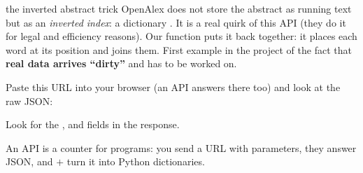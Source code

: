 \documentclass[11pt,a4paper]{article}
\begin{document}
\begin{concepto}{the inverted abstract trick}
OpenAlex does not store the abstract as running text but as an \emph{inverted index}: a
dictionary . It is a real quirk of this API
(they do it for legal and efficiency reasons). Our 
function puts it back together: it places each word at its position and joins them. First
example in the project of the fact that \textbf{real data arrives ``dirty''} and has to be
worked on.
\end{concepto}

\begin{practica}
Paste this URL into your browser (an API answers there too) and look at the raw JSON:
\begin{center}
\small{}
\end{center}
Look for the ,  and
 fields in the response.
\end{practica}

\begin{resumen}
An API is a counter for programs: you send a URL with parameters, they answer JSON, and
 $+$  turn it into Python dictionaries.
\end{resumen}
\end{document}
